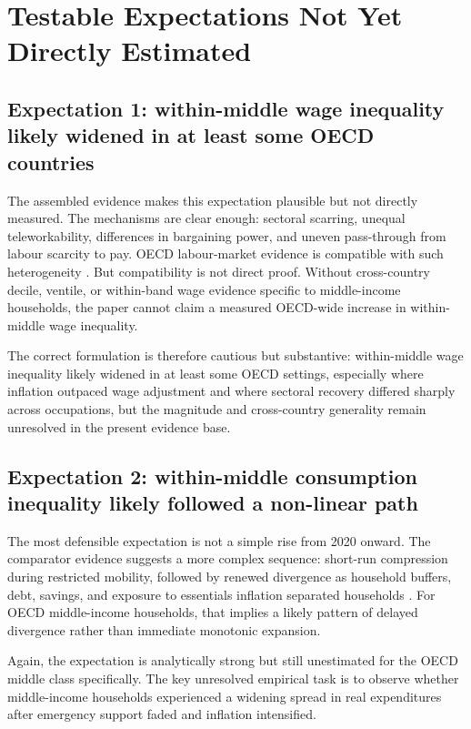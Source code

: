 \documentclass[11pt]{article}
\begin{document}
\section{Testable Expectations Not Yet Directly Estimated}

\subsection{Expectation 1: within-middle wage inequality likely widened in at least some OECD countries}
The assembled evidence makes this expectation plausible but not directly measured. The mechanisms are clear enough: sectoral scarring, unequal teleworkability, differences in bargaining power, and uneven pass-through from labour scarcity to pay. OECD labour-market evidence is compatible with such heterogeneity \citep{oecdemploymentoutl2024oecd}. But compatibility is not direct proof. Without cross-country decile, ventile, or within-band wage evidence specific to middle-income households, the paper cannot claim a measured OECD-wide increase in within-middle wage inequality.

The correct formulation is therefore cautious but substantive: within-middle wage inequality likely widened in at least some OECD settings, especially where inflation outpaced wage adjustment and where sectoral recovery differed sharply across occupations, but the magnitude and cross-country generality remain unresolved in the present evidence base.

\subsection{Expectation 2: within-middle consumption inequality likely followed a non-linear path}
The most defensible expectation is not a simple rise from 2020 onward. The comparator evidence suggests a more complex sequence: short-run compression during restricted mobility, followed by renewed divergence as household buffers, debt, savings, and exposure to essentials inflation separated households \citep{consumptioninequal2024bls}. For OECD middle-income households, that implies a likely pattern of delayed divergence rather than immediate monotonic expansion.

Again, the expectation is analytically strong but still unestimated for the OECD middle class specifically. The key unresolved empirical task is to observe whether middle-income households experienced a widening spread in real expenditures after emergency support faded and inflation intensified.
\end{document}
